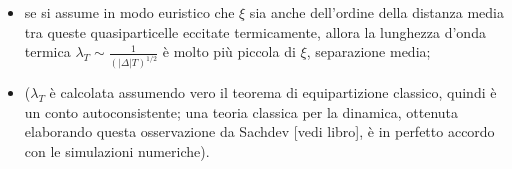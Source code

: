 \documentclass[a4paper,11pt]{article}
\newcommand{\csi}{\xi}
\begin{document}
\begin{itemize}
\begin{itemize}
       \item se si assume in modo euristico che $\csi$ sia anche dell'ordine della distanza media tra queste quasiparticelle eccitate termicamente, allora la lunghezza d'onda termica $\lambda_T \sim \frac{1}{(|\Delta|T)^{1/2}}$ è molto più piccola di $\csi$, separazione media; 
       \item ($\lambda_T$ è calcolata assumendo vero il teorema di equipartizione classico, quindi è un conto autoconsistente; una teoria classica per la dinamica, ottenuta elaborando questa osservazione da Sachdev [vedi libro], è in perfetto accordo con le simulazioni numeriche).
      \end{itemize}

\end{itemize}
\end{document}
